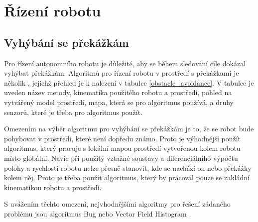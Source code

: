 \documentclass[twoside]{ctuthesis}
\theoremstyle{plain}
\theoremstyle{definition}
\theoremstyle{note}
\begin{document}
\chapter{Řízení robotu}

\section{Vyhýbání se překážkám}

Pro řízení autonomního robotu je důležité, aby se během sledování cíle dokázal vyhýbat překážkám. Algoritmů pro řízení robotu v prostředí s překážkami je několik \cite{cite:20}, jejichž přehled je k nalezení v tabulce \ref{obstacle_avoidance}. V tabulce je uveden název metody, kinematika použitého robotu a prostředí, pohled na vytvářený model prostředí, mapa, která se pro algoritmus používá, a druhy senzorů, které je třeba pro algoritmus použít.

Omezením na výběr algoritmu pro vyhýbání se překážkám je to, že se robot bude pohybovat v prostředí, které není dopředu známo. Proto je výhodnější použít algoritmus, který pracuje s lokální mapou prostředí vytvořenou kolem robotu místo globální. Navíc při použitý vztažné soustavy a diferenciálního výpočtu polohy a rychlosti robotu nelze přesně stanovit, kde se nachází on nebo překážky kolem něj. Proto je třeba použít algoritmus, který by pracoval pouze se zakládní kinematikou robotu a prostředí.

S uvážením těchto omezení, nejvhodnějšími algoritmy pro řešení zádaného problému jsou algoritmus Bug \cite[s. 272--276]{cite:20} nebo Vector Field Histogram \cite[s. 276--278]{cite:20}\cite{cite:12}.
\end{document}
